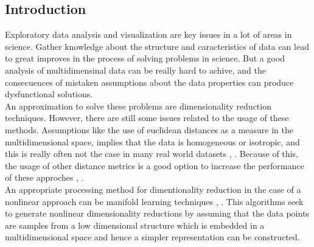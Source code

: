 \documentclass[a0,portrait]{a0poster}
\begin{document}
\begin{multicols}{3}

    \begin{abstract}
    This work presents a theorical and practical approximation to the problem
    of non-linear dimensionality reduction using the local linear embedding
    algorithm (Lle) and the multidimensional scaling method (Mds). In this work
    the Lle algorithm is implemented as a two step procedure. First a weighted
    data representation based in $K$ nearest neighbors is calculated, then a
    minimization of distance between the data representation and a low
    dimensionality configuration is conducted. In the second approach a
    distance matrix $D^x$ is constructed to approximate the distance over a
    manifold by solving shortest path problems over a graph that represents a
    multidimensional structure, then this matrix is used as input to the
    method. Finally the resulting algorithms are tested on 3-dimensional
    manifolds.
    \end{abstract}

    \section*{Introduction}

    Exploratory data analysis and visualization are key issues in a lot of areas
    in science. Gather knowledge about the structure and caracteristics of data
    can lead to great improves in the process of solving problems in science. But a
    good analysis of multidimensinal data can be really hard to achive, and the
    consecuences of mistaken assumptions about the data properties can produce
    dysfunctional solutions.\\

    An approximation to solve these problems are dimensionality reduction techniques.
    However, there are still some issues related to the usage of these methods.
    Assumptions like the use of euclidean distances as a measure in the
    multidimensional space, implies that the data is homogeneous or isotropic, and
    this is really often not the case in many real world datasets
    \cite{homogeneous1}, \cite{homogeneous2}. Because of this, the usage of other
    distance metrics is a good option to increase the performance of these approches
    \cite{dist1}, \cite{dist2}.\\

    An appropriate processing method for dimentionality reduction in the case of
    a nonlinear approach can be manifold learning techniques \cite{manifold1},
    \cite{manifold2}. This algorithms seek to generate nonlinear dimensionality
    reductions by assuming that the data points are samples from a low dimensional
    structure which is embedded in a multidimensional space and hence a simpler
    representation can be constructed. \cite{manifold_lle}\\


\end{multicols}
\end{document}
